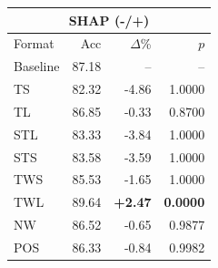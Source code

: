 \begin{tabular}{lrrr}
\toprule
\multicolumn{4}{c}{\textbf{SHAP (-/+)}} \\
\midrule
Format & Acc & $\Delta$\% & $p$ \\
\midrule
Baseline & 87.18 & -- & -- \\
\midrule
TS & 82.32 & -4.86 & 1.0000 \\
TL & 86.85 & -0.33 & 0.8700 \\
STL & 83.33 & -3.84 & 1.0000 \\
STS & 83.58 & -3.59 & 1.0000 \\
TWS & 85.53 & -1.65 & 1.0000 \\
TWL & 89.64 & \textbf{+2.47} & \textbf{0.0000} \\
NW & 86.52 & -0.65 & 0.9877 \\
POS & 86.33 & -0.84 & 0.9982 \\
\bottomrule
\end{tabular}